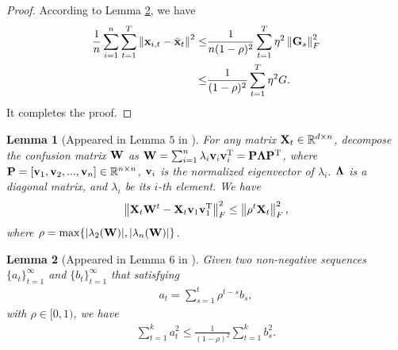 \documentclass{article}
\newtheorem{Lemma}{\bf{Lemma}}
\begin{document}
\begin{proof}
According to Lemma \ref{lemma_hanlin_2}, we have
\begin{align}
\nonumber
\frac{1}{n}\sum_{i=1}^n \sum_{t=1}^T \left\lVert{\bf x}_{i,t} - \bar{{\bf x}}_t\right\rVert^2 \le & \frac{1}{n(1-\rho)^2} \sum_{t=1}^T \eta^2 \left\lVert{\bf G}_s\right\rVert_F^2 \\ \nonumber
\le & \frac{1}{(1-\rho)^2} \sum_{t=1}^T \eta^2 G.
\end{align}
It completes the proof.


\end{proof}








\begin{Lemma}[Appeared in Lemma $5$ in \citep{Tang:2018un}]
\label{lemma_hanlin_1}
For any matrix ${\bf X}_t\in\mathbb{R}^{d\times n}$, decompose the confusion matrix ${\bf W}$ as ${\bf W} = \sum_{i=1}^n \lambda_i {\bf v}_i {\bf v}_i^{\rm T} = {\bf P} \mathbf{\Lambda} {\bf P}^{\rm T}$, where ${\bf P} = [{\bf v}_1, {\bf v}_2, ..., {\bf v}_n]\in\mathbb{R}^{n\times n}$, ${\bf v}_i$ is the normalized eigenvector of $\lambda_i$. $\mathbf{\Lambda}$ is a diagonal matrix, and $\lambda_i$ be its $i$-th element. We have
\begin{align}
\nonumber
\left\lVert{\bf X}_t {\bf W}^t - {\bf X}_t {\bf v}_1 {\bf v}_1^{\rm T} \right\rVert_F^2 \le \left\lVert\rho^t {\bf X}_t\right\rVert_F^2, 
\end{align} where  $\rho = \max \{| \lambda_2({\bf W}) |, | \lambda_n({\bf W}) |\}$. 

\end{Lemma}


\begin{Lemma}[Appeared in Lemma $6$ in \citep{Tang:2018un}]
\label{lemma_hanlin_2}
Given two non-negative sequences $\{a_t\}_{t=1}^{\infty}$ and $\{b_t\}_{t=1}^{\infty}$ that satisfying
\begin{align}
\nonumber
a_t = \sum_{s=1}^t \rho^{t-s} b_s,
\end{align} with $\rho \in [0,1)$, we have
\begin{align}
\nonumber
\sum_{t=1}^k a_t^2 \le \frac{1}{(1-\rho)^2}\sum_{t=1}^k b_s^2.
\end{align}
\end{Lemma}


















\end{document}
